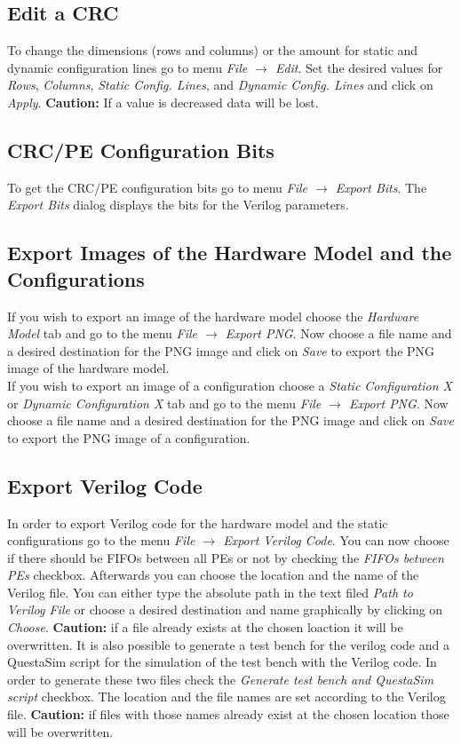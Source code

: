 \documentclass{article}
\begin{document}
\subsection*{Edit a CRC}
To change the dimensions (rows and columns) or the amount for static and dynamic configuration lines go to menu \textit{File $\rightarrow$ Edit}. Set the desired values for \textit{Rows}, \textit{Columns}, \textit{Static Config. Lines}, and \textit{Dynamic Config. Lines} and click on \textit{Apply}. \textbf{Caution:} If a value is decreased data will be lost.

\subsection*{CRC/PE Configuration Bits}
To get the CRC/PE configuration bits go to menu \textit{File $\rightarrow$ Export Bits}. The \textit{Export Bits} dialog displays the bits for the Verilog parameters.

\subsection*{Export Images of the Hardware Model and the Configurations}
If you wish to export an image of the hardware model choose the \textit{Hardware Model} tab and go to the menu \textit{File $\rightarrow$ Export PNG}. Now choose a file name and a desired destination for the PNG image and click on \textit{Save} to export the PNG image of the hardware model.\\
If you wish to export an image of a configuration choose a \textit{Static Configuration X} or \textit{Dynamic Configuration X} tab and go to the menu \textit{File $\rightarrow$ Export PNG}. Now choose a file name and a desired destination for the PNG image and click on \textit{Save} to export the PNG image of a configuration. 

\subsection*{Export Verilog Code}
In order to export Verilog code for the hardware model and the static configurations go to the menu \textit{File $\rightarrow$ Export Verilog Code}. You can now choose if there should be FIFOs between all PEs or not by checking the \textit{FIFOs between PEs} checkbox. Afterwards you can choose the location and the name of the Verilog file. You can either type the absolute path in the text filed \textit{Path to Verilog File} or choose a desired destination and name graphically by clicking on \textit{Choose}. \textbf{Caution:} if a file already exists at the chosen loaction it will be overwritten. It is also possible to generate a test bench for the verilog code and a QuestaSim script for the simulation of the test bench with the Verilog code. In order to generate these two files check the \textit{Generate test bench and QuestaSim script} checkbox. The location and the file names are set according to the Verilog file. \textbf{Caution:} if files with those names already exist at the chosen location those will be overwritten.\\
\end{document}
